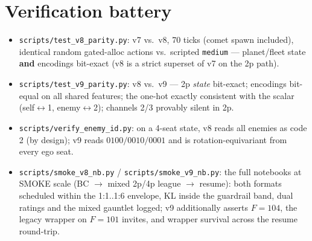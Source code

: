 \documentclass[11pt]{article}
\newcommand{\cd}[1]{\texttt{#1}}
\begin{document}
\section{Verification battery}\label{v9:verify}
\begin{itemize}[nosep,leftmargin=1.6em]
\item \cd{scripts/test\_v8\_parity.py}: v7 vs.\ v8, 70 ticks (comet spawn included), identical
  random gated-alloc actions vs.\ scripted \cd{medium} --- planet/fleet state \textbf{and}
  encodings bit-exact (v8 is a strict superset of v7 on the 2p path).
\item \cd{scripts/test\_v9\_parity.py}: v8 vs.\ v9 --- 2p \emph{state} bit-exact; encodings
  bit-equal on all shared features; the one-hot exactly consistent with the scalar
  (self$\leftrightarrow$1, enemy$\leftrightarrow$2); channels 2/3 provably silent in 2p.
\item \cd{scripts/verify\_enemy\_id.py}: on a 4-seat state, v8 reads all enemies as code 2 (by
  design); v9 reads $0100/0010/0001$ and is rotation-equivariant from every ego seat.
\item \cd{scripts/smoke\_v8\_nb.py} / \cd{scripts/smoke\_v9\_nb.py}: the full notebooks at SMOKE
  scale (BC $\to$ mixed 2p/4p league $\to$ resume): both formats scheduled within the 1:1..1:6
  envelope, KL inside the guardrail band, dual ratings and the mixed gauntlet logged; v9
  additionally asserts $F{=}104$, the legacy wrapper on $F{=}101$ invites, and wrapper survival
  across the resume round-trip.
\end{itemize}

\end{document}
